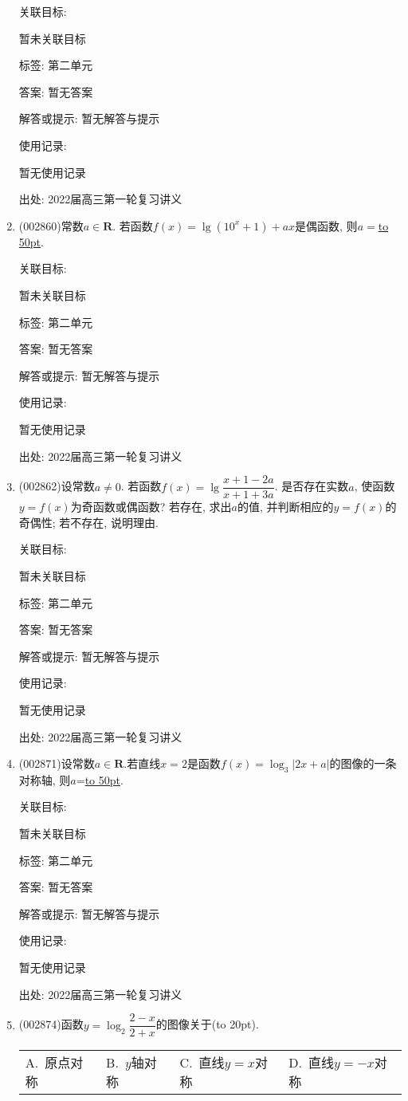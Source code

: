 \documentclass[10pt,a4paper]{article}
\newcommand{\blank}[1]{\underline{\hbox to #1pt{}}}
\newcommand{\bracket}[1]{(\hbox to #1pt{})}
\newcommand{\fourch}[4]{\par\begin{tabular}{p{.23\textwidth}p{.23\textwidth}p{.23\textwidth}p{.23\textwidth}}
A.~#1 &B.~#2& C.~#3& D.~#4
\end{tabular}}
\begin{document}
\begin{enumerate}[1.]
关联目标:

暂未关联目标



标签: 第二单元

答案: 暂无答案

解答或提示: 暂无解答与提示

使用记录:

暂无使用记录


出处: 2022届高三第一轮复习讲义
\item { (002860)}常数$a\in \mathbf{R}$. 若函数$f(x)=\lg(10^x+1)+ax$是偶函数, 则$a=$\blank{50}.


关联目标:

暂未关联目标



标签: 第二单元

答案: 暂无答案

解答或提示: 暂无解答与提示

使用记录:

暂无使用记录


出处: 2022届高三第一轮复习讲义
\item { (002862)}设常数$a\ne 0$. 若函数$f(x)=\lg \dfrac{x+1-2a}{x+1+3a}$. 是否存在实数$a$, 使函数$y=f(x)$为奇函数或偶函数? 若存在, 求出$a$的值, 并判断相应的$y=f(x)$的奇偶性; 若不存在, 说明理由.


关联目标:

暂未关联目标



标签: 第二单元

答案: 暂无答案

解答或提示: 暂无解答与提示

使用记录:

暂无使用记录


出处: 2022届高三第一轮复习讲义
\item { (002871)}设常数$a\in \mathbf{R}$.若直线$x=2$是函数$f(x)=\log_3|2x+a|$的图像的一条对称轴, 则$a$=\blank{50}.


关联目标:

暂未关联目标



标签: 第二单元

答案: 暂无答案

解答或提示: 暂无解答与提示

使用记录:

暂无使用记录


出处: 2022届高三第一轮复习讲义
\item { (002874)}函数$y=\log_2\dfrac{2-x}{2+x}$的图像关于\bracket{20}.
\fourch{原点对称}{$y$轴对称}{直线$y=x$对称}{直线$y=-x$对称}



\end{enumerate}
\end{document}
